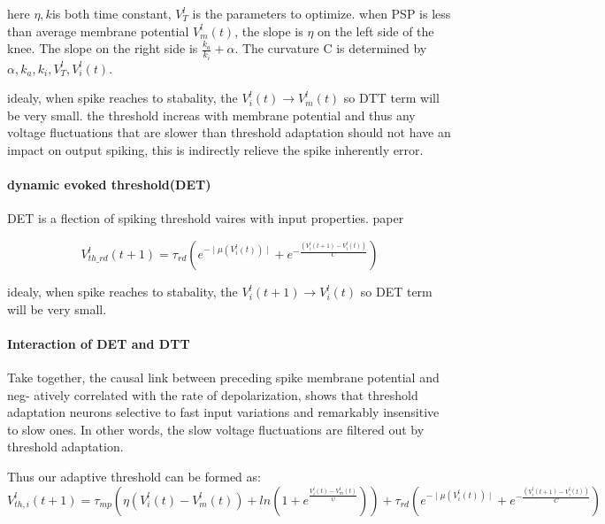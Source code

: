 \documentclass{article}
\begin{document}
here $\eta, k$is both time constant, $V_{T}^l$ is the parameters to optimize. when PSP is less than average membrane potential $V_m^l(t)$, the slope is $\eta$ on the left side of the knee. The slope on the right side is $\frac{k_a}{k_i} + \alpha$. The curvature C is determined by $\alpha, k_a, k_i, V_{T}^l, V_i^l(t)$.

idealy, when spike reaches to stabality, the $V_i^l(t) \to V_m^l(t)$ so DTT term will be very small.
the threshold increas with membrane potential and thus any voltage fluctuations that are slower than threshold adaptation should not have an impact on output spiking, this is indirectly relieve the spike inherently error.

\paragraph{dynamic evoked threshold(DET)} DET is a flection of spiking threshold vaires with input properties. paper

\begin{equation}
  V_{th\_rd}^l(t+1) = \tau_{rd}\left(e^{-\mid\mu\left(V_i^l(t)\right)\mid} + e^{-\frac{\left(V_i^l(t+1)-V_i^l(t)\right)}{C}}\right)
\end{equation}

idealy, when spike reaches to stabality, the $V_i^l(t+1) \to V_i^l(t)$ so DET term will be very small.

\paragraph{Interaction of DET and DTT} Take together, the causal link between preceding spike membrane potential and neg-
atively correlated with the rate of depolarization, shows that threshold adaptation neurons selective to fast input variations and remarkably insensitive to slow ones. In other words, the slow voltage fluctuations are filtered out by threshold adaptation.

Thus our adaptive threshold can be formed as:
\begin{equation}
  V_{th,i}^l(t+1) = \tau_{mp}\left(\eta\left(V_i^l(t)-V_m^l(t)\right)+ln\left(1+e^{\frac{V_i^l(t)-V_m^l(t)}{\psi}}\right)\right) + \tau_{rd}\left(e^{-\mid\mu\left(V_i^l(t)\right)\mid} + e^{-\frac{\left(V_i^l(t+1)-V_i^l(t)\right)}{C}}\right)
\end{equation}
\end{document}

